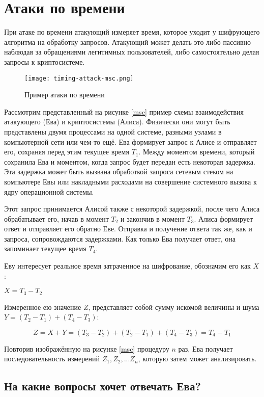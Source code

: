 \section{Атаки по времени}

При атаке по времени атакующий измеряет время, которое уходит у шифрующего
алгоритма на обработку запросов. Атакующий может делать это либо пассивно
наблюдая за обращениями легитимных пользователей, либо самостоятельно делая
запросы к криптосистеме.

\begin{figure}[h]
    \centering
    \texttt{[image: timing-attack-msc.png]}
    \caption{Пример атаки по времени}
\end{figure} \label{msc}

Рассмотрим представленный на рисунке \ref{msc} пример схемы взаимодействия атакующего (Ева)
и криптосистемы (Алиса). Физически они могут быть представлены двумя процессами на одной
системе, разными узлами в компьютерной сети или чем-то ещё. Ева формирует запрос
к Алисе и отправляет его, сохраняя перед этим текущее время $T_1$. Между
моментом времени, который сохранила Ева и моментом, когда запрос будет передан
есть некоторая задержка. Эта задержка может быть вызвана обработкой запроса
сетевым стеком на компьютере Евы или накладными расходами на совершение системного
вызова к ядру операционной системы. 

Этот запрос принимается Алисой также с некоторой задержкой, после чего Алиса
обрабатывает его, начав в момент $T_2$ и закончив в момент $T_3$. Алиса
формирует ответ и отправляет его обратно Еве. Отправка и получение ответа так же,
как и запроса, сопровождаются задержками. Как только Ева получает ответ, она
запоминает текущее время $T_4$.

Еву интересует реальное время затраченное на шифрование, обозначим его как $X$ :

$X = T_3 - T_2$

Измеренное ею значение $Z$, представляет собой сумму искомой величины и шума
$Y = (T_2 - T_1) + (T_4 - T_3)$:

\begin{equation}
Z = X + Y = (T_3 - T_2) + (T_2 - T_1) + (T_4 - T_3) = T_4 - T_1
\end{equation}

Повторив изображённую на рисунке \ref{msc} процедуру $n$ раз, Ева получает
последовательность измерений ${Z_1, Z_2, ... Z_n}$, которую затем может анализировать.

\subsection{На какие вопросы хочет отвечать Ева?}

